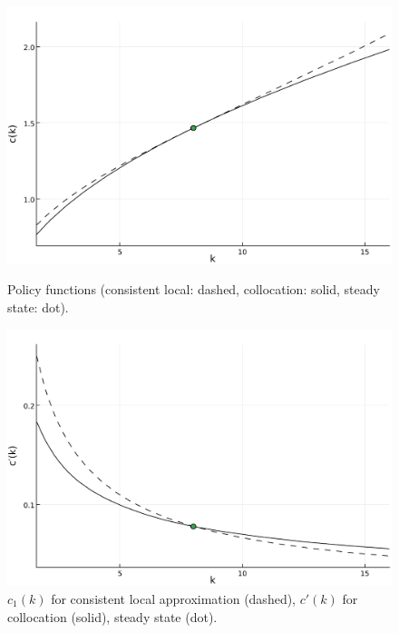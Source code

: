 \documentclass[a4paper,11pt]{article}
\newcommand{\figwidth}{\linewidth}
\begin{document}
\clearpage
\begin{figure}[b]
  \centering
  \begin{minipage}[t]{0.48\linewidth}
    \includegraphics[width=\figwidth]{../fig/ck.pdf}
    \caption{Policy functions (consistent local: dashed, collocation: solid, steady state: dot).}
    \label{fig:ck}
  \end{minipage}\hfill%
  \begin{minipage}[t]{0.48\linewidth}
    \includegraphics[width=\figwidth]{../fig/ckprime.pdf}
    \caption{$c_1(k)$ for consistent local approximation (dashed), $c'(k)$ for collocation (solid), steady state (dot).}
    \label{fig:ckprime}
  \end{minipage}
  \begin{minipage}[t]{0.48\linewidth}

\end{minipage}
\end{figure}
\end{document}
